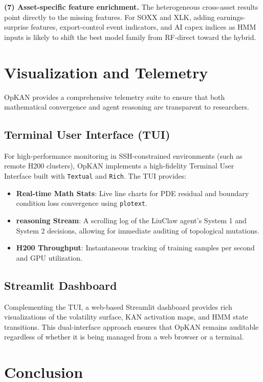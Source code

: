 \documentclass[11pt,a4paper]{article}
\begin{document}
\textbf{(7) Asset-specific feature enrichment.} The heterogeneous cross-asset results point directly to the missing features. For SOXX and XLK, adding earnings-surprise features, export-control event indicators, and AI capex indices as HMM inputs is likely to shift the best model family from RF-direct toward the hybrid.

\section{Visualization and Telemetry}
\label{sec:telemetry}

OpKAN provides a comprehensive telemetry suite to ensure that both mathematical convergence and agent reasoning are transparent to researchers.

\subsection{Terminal User Interface (TUI)}
For high-performance monitoring in SSH-constrained environments (such as remote H200 clusters), OpKAN implements a high-fidelity Terminal User Interface built with \texttt{Textual} and \texttt{Rich}. The TUI provides:
\begin{itemize}
    \item \textbf{Real-time Math Stats}: Live line charts for PDE residual and boundary condition loss convergence using \texttt{plotext}.
    \item \textbf{reasoning Stream}: A scrolling log of the LiuClaw agent's System 1 and System 2 decisions, allowing for immediate auditing of topological mutations.
    \item \textbf{H200 Throughput}: Instantaneous tracking of training samples per second and GPU utilization.
\end{itemize}

\subsection{Streamlit Dashboard}
Complementing the TUI, a web-based Streamlit dashboard provides rich visualizations of the volatility surface, KAN activation maps, and HMM state transitions. This dual-interface approach ensures that OpKAN remains auditable regardless of whether it is being managed from a web browser or a terminal.

\section{Conclusion}
\label{sec:conclusion}
\end{document}

